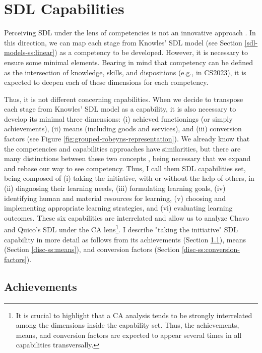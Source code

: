 \section{SDL Capabilities}
\label{disc-sec:sdl-capabilities}

Perceiving \gls{SDL} under the lens of competencies is not an innovative approach \cite{patterson:2002,morris:2019,colomer:2021}. In this direction, we can map each stage from Knowles' \gls{SDL} model (see Section \ref{sdl-models-ss:linear}) as a competency to be developed. However, it is necessary to ensure some minimal elements. Bearing in mind that competency can be defined as the intersection of knowledge, skills, and dispositions (e.g.,  in \acrfull{CS2023}), it is expected to deepen each of these dimensions for each competency.

Thus, it is not different concerning capabilities. When we decide to transpose each stage from Knowles' \gls{SDL} model as a capability, it is also necessary to develop its minimal three dimensions: (i) achieved functionings (or simply achievements), (ii) means (including goods and services), and (iii) conversion factors (see Figure \ref{fig:grouped-robeyns-representation}).
We already know that the competencies and capabilities approaches have similarities, but there are many distinctions between these two concepts \cite{lozano:2012}, being necessary that we expand and rebase our way to see competency. Thus, I call them \gls{SDL} capabilities set, being composed of (i) taking the initiative, with or without the help of others, in (ii) diagnosing their learning needs, (iii) formulating learning goals, (iv) identifying human and material resources for learning, (v) choosing and implementing appropriate learning strategies, and (vi) evaluating learning outcomes. These six capabilities are interrelated and allow us to analyze Chavo and Quico’s \gls{SDL} under the \acrfull{CA} lens\footnote{It is crucial to highlight that a \gls{CA} analysis tends to be strongly interrelated among the dimensions inside the capability set. Thus, the achievements, means, and conversion factors are expected to appear several times in all capabilities transversally.}. I describe "taking the initiative" \gls{SDL} capability in more detail as follows from its achievements (Section \ref{disc-ss:achievements}), means (Section \ref{disc-ss:means}), and conversion factors (Section \ref{disc-ss:conversion-factors}).

\subsection{Achievements}
\label{disc-ss:achievements}

